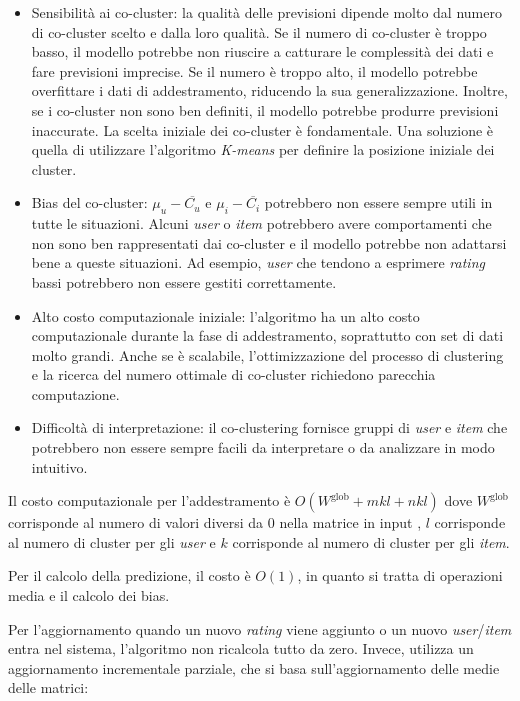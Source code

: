 \begin{itemize}
  \item Sensibilità ai co-cluster: la qualità delle previsioni dipende molto dal numero di co-cluster scelto e dalla loro qualità. Se il numero di co-cluster è troppo basso, il modello potrebbe non riuscire a catturare le complessità dei dati e fare previsioni imprecise. Se il numero è troppo alto, il modello potrebbe overfittare i dati di addestramento, riducendo la sua generalizzazione. Inoltre, se i co-cluster non sono ben definiti, il modello potrebbe produrre previsioni inaccurate. La scelta iniziale dei co-cluster è fondamentale. Una soluzione è quella di utilizzare l'algoritmo \textit{K-means} per definire la posizione iniziale dei cluster.
  \item Bias del co-cluster: $ \mu_u - \overline{C_u} $ e $ \mu_i - \overline{C_i} $ potrebbero non essere sempre utili in tutte le situazioni. Alcuni \textit{user} o \textit{item} potrebbero avere comportamenti che non sono ben rappresentati dai co-cluster e il modello potrebbe non adattarsi bene a queste situazioni. Ad esempio, \textit{user} che tendono a esprimere \textit{rating} bassi potrebbero non essere gestiti correttamente.
  \item Alto costo computazionale iniziale: l'algoritmo ha un alto costo computazionale durante la fase di addestramento, soprattutto con set di dati molto grandi. Anche se è scalabile, l'ottimizzazione del processo di clustering e la ricerca del numero ottimale di co-cluster richiedono parecchia computazione.
  \item Difficoltà di interpretazione: il co-clustering fornisce gruppi di \textit{user} e \textit{item} che potrebbero non essere sempre facili da interpretare o da analizzare in modo intuitivo.
\end{itemize}

Il costo computazionale per l'addestramento è $ O(W^{\text{glob}} + mkl + nkl) $ dove $ W^{\text{glob}} $ corrisponde al numero di valori diversi da 0 nella matrice in input , $l$ corrisponde al numero di cluster per gli \textit{user} e $k$ corrisponde al numero di cluster per gli \textit{item}.

Per il calcolo della predizione, il costo è $O(1)$, in quanto si tratta di operazioni media e il calcolo dei bias.

Per l'aggiornamento quando un nuovo \textit{rating} viene aggiunto o un nuovo \textit{user}/\textit{item} entra nel sistema, l'algoritmo non ricalcola tutto da zero. Invece, utilizza un aggiornamento incrementale parziale, che si basa sull'aggiornamento delle medie delle matrici:

